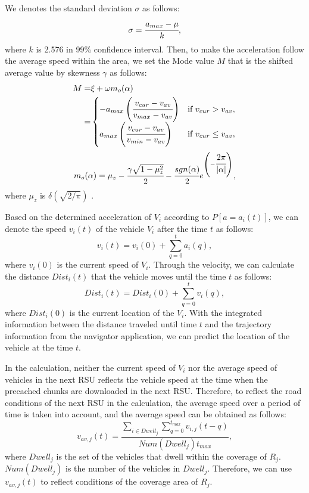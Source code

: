 \documentclass[journal]{IEEEtran}
\begin{document}
We denotes the standard deviation $\sigma$ as follows:
\begin{equation}
    \sigma = \cfrac{a_{max}-\mu}{k},
\end{equation}
where $k$ is 2.576 in 99\% confidence interval.
Then, to make the acceleration follow the average speed within the area, we set the Mode value $M$ that is the shifted average value by skewness $\gamma$ as follows:
\begin{equation}
    \begin{split}
        M=&\xi+\omega m_o(\alpha) \\
         =& \begin{cases}
            - a_{max}\left( \cfrac{v_{cur}-v_{av}}{v_{max}-v_{av}}\right) & \text{if } v_{cur} > v_{av}, \\
            a_{max}\left( \cfrac{v_{cur}-v_{av}}{v_{min}-v_{av}}\right) & \text{if } v_{cur} \leq v_{av},
            \end{cases}
    \end{split}
\end{equation}
\begin{equation}
    m_o(\alpha) = \mu_{z} - \cfrac{\gamma\sqrt{1-\mu_{z}^{2}}}{2} - \cfrac{sgn(\alpha)}{2} e^{\left(-\cfrac{2\pi}{|\alpha|}\right)},
\end{equation}
where $\mu_{z}$ is $\delta(\sqrt{2/\pi})$ \cite{Azzalini}.


Based on the determined acceleration of $V_{i}$ according to $P[a = a_{i}(t)]$, we can denote the speed $v_{i}(t)$ of the vehicle $V_{i}$ after the time $t$ as follows:
\begin{equation}
    v_{i}(t) = v_{i}(0) + \sum_{q=0}^{t} a_{i}(q),
\end{equation}
where $v_{i}(0)$ is the current speed of $V_{i}$.
Through the velocity, we can calculate the distance $Dist_{i}(t)$ that the vehicle moves until the time $t$ as follows:
\begin{equation}
    Dist_{i}(t) = Dist_{i}(0) + \sum_{q=0}^{t} v_{i}(q),
\end{equation}
where $Dist_{i}(0)$ is the current location of the $V_{i}$.
With the integrated information between the distance traveled until time $t$ and the trajectory information from the navigator application, we can predict the location of the vehicle at the time $t$.

In the calculation, neither the current speed of $V_{i}$ nor the average speed of vehicles in the next RSU reflects the vehicle speed at the time when the precached chunks are downloaded in the next RSU.
Therefore, to reflect the road conditions of the next RSU in the calculation, the average speed over a period of time is taken into account, and the average speed can be obtained as follows:
\begin{equation}
    v_{av, j}(t) = \frac{\sum_{i\in Dwell_{j}}\sum_{q=0}^{t_{max}}v_{i, j}(t-q)}{Num(Dwell_{j})t_{max}},
\end{equation}
where $Dwell_{j}$ is the set of the vehicles that dwell within the coverage of $R_{j}$.
$Num(Dwell_{j})$ is the number of the vehicles in $Dwell_{j}$.
Therefore, we can use $v_{av, j}(t)$ to reflect conditions of the coverage area of $R_{j}$.
\end{document}
